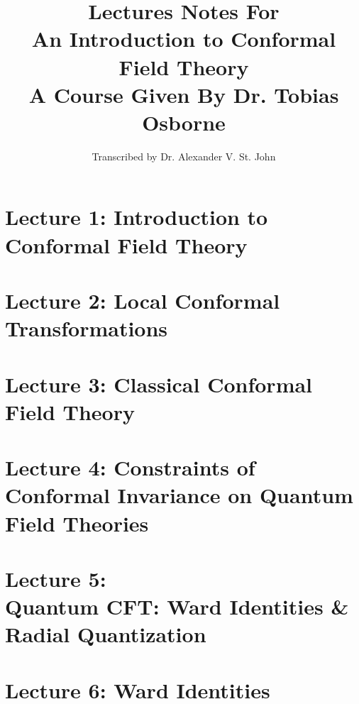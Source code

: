 \documentclass[10pt]{article}
\title{Lectures Notes For \\ An Introduction to Conformal Field Theory \\ A Course Given By Dr. Tobias Osborne}
\author{Transcribed by Dr. Alexander V. St. John}
\begin{document}
\maketitle

\clearpage

\tableofcontents
\newpage

\section{Lecture 1: Introduction to Conformal Field Theory}
\label{sec: lec1}



\clearpage

\section{Lecture 2: Local Conformal Transformations}
\label{sec: lec2}



\clearpage

\section{Lecture 3: Classical Conformal Field Theory}
\label{sec: lec3}



\clearpage

\section{Lecture 4: Constraints of Conformal Invariance on Quantum Field Theories}
\label{sec: lec4}



\clearpage

\section{Lecture 5: \\ Quantum CFT: Ward Identities \& Radial Quantization}
\label{sec: lec5}



\clearpage

\section{Lecture 6: Ward Identities}
\label{sec: lec6}
\end{document}
